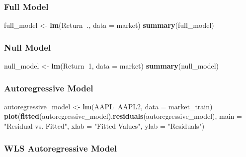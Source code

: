 \documentclass[]{article}
\newenvironment{Shaded}{\begin{snugshade}}{\end{snugshade}}
\newcommand{\KeywordTok}[1]{\textcolor[rgb]{0.13,0.29,0.53}{\textbf{#1}}}
\newcommand{\DataTypeTok}[1]{\textcolor[rgb]{0.13,0.29,0.53}{#1}}
\newcommand{\DecValTok}[1]{\textcolor[rgb]{0.00,0.00,0.81}{#1}}
\newcommand{\StringTok}[1]{\textcolor[rgb]{0.31,0.60,0.02}{#1}}
\newcommand{\OperatorTok}[1]{\textcolor[rgb]{0.81,0.36,0.00}{\textbf{#1}}}
\newcommand{\NormalTok}[1]{#1}
\begin{document}
\subsubsection{Full Model}\label{full-model}

\begin{Shaded}
\begin{Highlighting}[]
\NormalTok{full_model <-}\StringTok{ }\KeywordTok{lm}\NormalTok{(Return}\OperatorTok{~}\NormalTok{., }\DataTypeTok{data =}\NormalTok{ market)}
\KeywordTok{summary}\NormalTok{(full_model)}
\end{Highlighting}
\end{Shaded}

\subsubsection{Null Model}\label{null-model}

\begin{Shaded}
\begin{Highlighting}[]
\NormalTok{null_model <-}\StringTok{ }\KeywordTok{lm}\NormalTok{(Return}\OperatorTok{~}\DecValTok{1}\NormalTok{, }\DataTypeTok{data =}\NormalTok{ market)}
\KeywordTok{summary}\NormalTok{(null_model)}
\end{Highlighting}
\end{Shaded}

\subsubsection{Autoregressive Model}\label{autoregressive-model}

\begin{Shaded}
\begin{Highlighting}[]
\NormalTok{autoregressive_model <-}\StringTok{ }\KeywordTok{lm}\NormalTok{(AAPL}\OperatorTok{~}\NormalTok{AAPL2, }\DataTypeTok{data =}\NormalTok{ market_train)}
\KeywordTok{plot}\NormalTok{(}\KeywordTok{fitted}\NormalTok{(autoregressive_model),}\KeywordTok{residuals}\NormalTok{(autoregressive_model), }
     \DataTypeTok{main =} \StringTok{"Residual vs. Fitted"}\NormalTok{, }\DataTypeTok{xlab =} \StringTok{"Fitted Values"}\NormalTok{, }\DataTypeTok{ylab =} \StringTok{"Residuals"}\NormalTok{)}
\end{Highlighting}
\end{Shaded}

\subsubsection{WLS Autoregressive Model}\label{wls-autoregressive-model}
\end{document}
